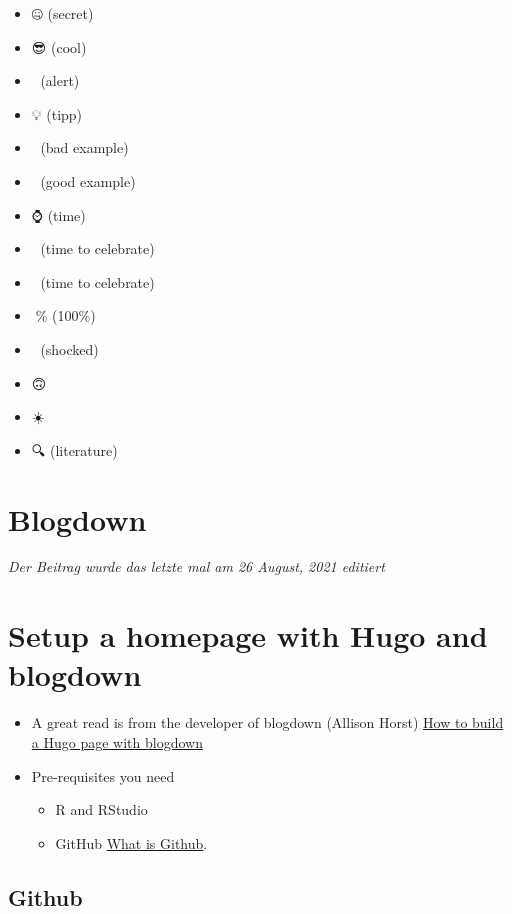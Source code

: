 \documentclass[
]{article}
\providecommand{\tightlist}{%
  \setlength{\itemsep}{0pt}\setlength{\parskip}{0pt}}
\begin{document}
\begin{itemize}
\tightlist
\item
  🤐 (secret)
\item
  😎 (cool)
\item
  🚨 (alert)
\item
  💡 (tipp)
\item
  💩 (bad example)
\item
  💪 (good example)
\item
  ⌚️ (time)
\item
  🍻 (time to celebrate)
\item
  🎉 (time to celebrate)
\item
  💯\% (100\%)
\item
  🤯 (shocked)
\item
  🙃
\item
  ☀️
\item
  🔍 (literature)
\end{itemize}

\hypertarget{blogdown}{%
\section{Blogdown}\label{blogdown}}

\emph{Der Beitrag wurde das letzte mal am 26 August, 2021 editiert}

\hypertarget{setup-a-homepage-with-hugo-and-blogdown}{%
\section{Setup a homepage with Hugo and blogdown}\label{setup-a-homepage-with-hugo-and-blogdown}}

\begin{itemize}
\tightlist
\item
  A great read is from the developer of blogdown (Allison Horst) \href{https://alison.rbind.io/post/new-year-new-blogdown/\#pre-requisites}{How
  to build a Hugo page with
  blogdown}
\item
  Pre-requisites you need

  \begin{itemize}
  \tightlist
  \item
    R and RStudio
  \item
    GitHub \href{https://happygitwithr.com/}{What is Github}.
  \end{itemize}
\end{itemize}

\hypertarget{github-1}{%
\subsection{Github}\label{github-1}}
\end{document}
